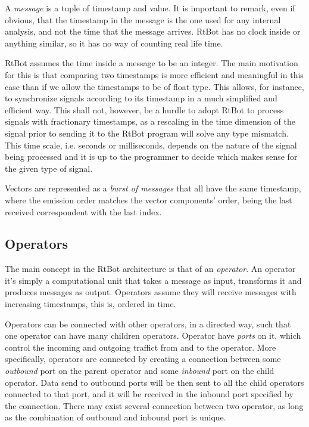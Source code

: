 \documentclass[preprint,1p,times]{elsarticle}
\begin{document}
A \textit{message} is a tuple of timestamp and value. It is important to remark, even if 
obvious, that the timestamp in the message is the one used for any internal 
analysis, and not the time that the message arrives. RtBot has no clock inside or 
anything similar, so it has no way of counting real life time.


RtBot assumes the time inside a message to be an integer. The main motivation for 
this is that comparing two timestamps is more efficient and meaningful in this 
case than if we allow the timestamps to be of float type. This allows, for 
instance, to synchronize signals according to its timestamp in a much simplified 
and efficient way. This shall not, however, be a hurdle to adopt RtBot to process 
signals with fractionary timestamps, as a rescaling in the time dimension of the 
signal prior to sending it to the RtBot program will solve any type mismatch. This 
time scale, i.e. seconds or milliseconds, depends on the nature of the signal 
being processed and it is up to the programmer to decide which makes sense for the 
given type of signal.


Vectors are represented as a \textit{burst of messages} that all have the same timestamp,
where the emission order matches the vector components' order, being the last received
correspondent with the last index.

\subsection{Operators}
The main concept in the RtBot architecture is that of an \textit{operator}. An operator 
it’s simply a computational unit that takes a message as input, transforms it and produces 
messages as output. Operators assume they will receive messages with 
increasing timestamps, this is, ordered in time.


Operators can be connected with other operators, in a directed way, such that one 
operator can have many children operators. Operator have \textit{ports} on it, which control
the incoming and outgoing traffict from and to the operator. More specifically, operators
are connected by creating a connection between some \textit{outbound} port on the parent
operator and some \textit{inbound} port on the child operator. Data send to outbound ports will be then
sent to all the child operators connected to that port, and it will be received in the inbound
port specified by the connection.
There may exist several connection between two operator, as long as
the combination of outbound and inbound port is unique.
\end{document}
